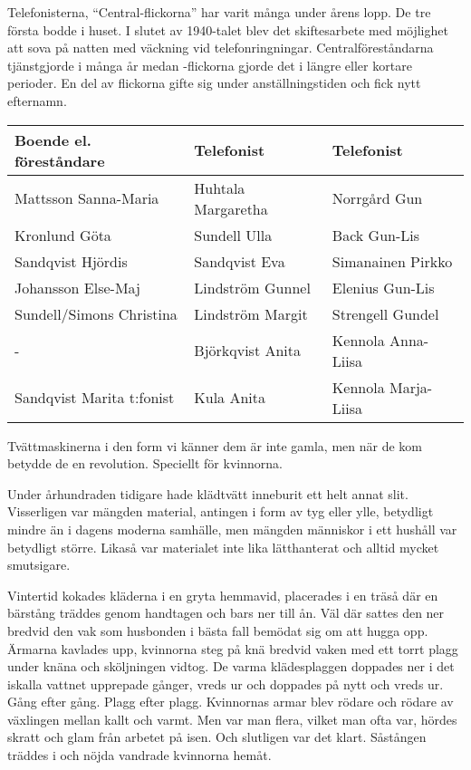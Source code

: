 Telefonisterna, ``Central-flickorna'' har varit många under årens lopp. De tre första bodde i huset. I slutet av 1940-talet blev det skiftesarbete med möjlighet att sova på natten med väckning vid telefonringningar. Centralföreståndarna tjänstgjorde i många år medan -flickorna gjorde det i längre eller kortare perioder. En del av flickorna gifte sig under anställningstiden och fick nytt efternamn.

\begin{center}
  \begin{tabular}{l l l}
    \hline
    Boende el. föreståndare & Telefonist & Telefonist\\ \hline
    Mattsson Sanna-Maria & Huhtala Margaretha & Norrgård Gun \\
    Kronlund Göta & Sundell Ulla & Back Gun-Lis \\
    Sandqvist Hjördis & Sandqvist Eva & Simanainen Pirkko \\
    Johansson Else-Maj & Lindström Gunnel & Elenius Gun-Lis \\
    Sundell/Simons Christina & Lindström Margit & Strengell Gundel \\
    - & Björkqvist Anita & Kennola Anna-Liisa \\
    Sandqvist Marita t:fonist & Kula Anita & Kennola Marja-Liisa\\ \hline
  \end{tabular}
\end{center}




Tvättmaskinerna i den form vi känner dem är inte gamla, men när de kom betydde de en revolution. Speciellt för kvinnorna.

Under århundraden tidigare hade klädtvätt inneburit ett helt annat slit. Visserligen var mängden material, antingen i form av tyg eller ylle, betydligt mindre än i dagens moderna samhälle, men mängden människor i ett hushåll var betydligt större. Likaså var materialet
inte lika lätthanterat och alltid mycket smutsigare.

Vintertid kokades kläderna  i en gryta hemmavid, placerades i en träså där en bärstång träddes genom handtagen och bars ner till ån. Väl där sattes den ner bredvid den vak som husbonden i bästa fall bemödat sig om att hugga opp. Ärmarna kavlades upp, kvinnorna steg på knä bredvid vaken med ett torrt plagg under knäna och sköljningen vidtog. De varma klädesplaggen doppades ner i det iskalla vattnet upprepade gånger, vreds ur och doppades på nytt och vreds ur. Gång efter gång. Plagg efter plagg. Kvinnornas armar blev rödare och rödare av växlingen mellan kallt och varmt. Men var man flera, vilket man ofta var, hördes skratt och glam från arbetet på isen. Och slutligen var det klart. Såstången träddes i och nöjda vandrade kvinnorna hemåt.

